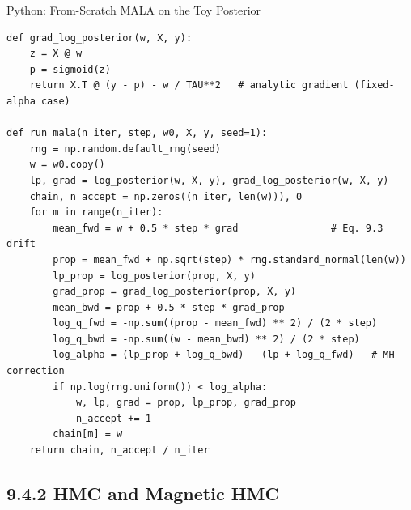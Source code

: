 \documentclass[aspectratio=169,10pt]{beamer}
\begin{document}
\begin{frame}[fragile]{Python: From-Scratch MALA on the Toy Posterior}
\begin{lstlisting}
def grad_log_posterior(w, X, y):
    z = X @ w
    p = sigmoid(z)
    return X.T @ (y - p) - w / TAU**2   # analytic gradient (fixed-alpha case)

def run_mala(n_iter, step, w0, X, y, seed=1):
    rng = np.random.default_rng(seed)
    w = w0.copy()
    lp, grad = log_posterior(w, X, y), grad_log_posterior(w, X, y)
    chain, n_accept = np.zeros((n_iter, len(w))), 0
    for m in range(n_iter):
        mean_fwd = w + 0.5 * step * grad                # Eq. 9.3 drift
        prop = mean_fwd + np.sqrt(step) * rng.standard_normal(len(w))
        lp_prop = log_posterior(prop, X, y)
        grad_prop = grad_log_posterior(prop, X, y)
        mean_bwd = prop + 0.5 * step * grad_prop
        log_q_fwd = -np.sum((prop - mean_fwd) ** 2) / (2 * step)
        log_q_bwd = -np.sum((w - mean_bwd) ** 2) / (2 * step)
        log_alpha = (lp_prop + log_q_bwd) - (lp + log_q_fwd)   # MH correction
        if np.log(rng.uniform()) < log_alpha:
            w, lp, grad = prop, lp_prop, grad_prop
            n_accept += 1
        chain[m] = w
    return chain, n_accept / n_iter
\end{lstlisting}
\end{frame}

\subsection{9.4.2 HMC and Magnetic HMC}
\end{document}
